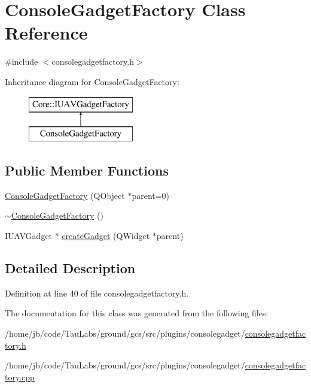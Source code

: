 \hypertarget{class_console_gadget_factory}{\section{\-Console\-Gadget\-Factory \-Class \-Reference}
\label{class_console_gadget_factory}
}


{\ttfamily \#include $<$consolegadgetfactory.\-h$>$}

\-Inheritance diagram for \-Console\-Gadget\-Factory\-:\begin{figure}[H]
\begin{center}
\leavevmode
\includegraphics[height=2.000000cm]{class_console_gadget_factory}
\end{center}
\end{figure}
\subsection*{\-Public \-Member \-Functions}
\begin{DoxyCompactItemize}
\item 
\hyperlink{group___console_plugin_ga77777adade86473e7c810b2e0a64e5b0}{\-Console\-Gadget\-Factory} (\-Q\-Object $\ast$parent=0)
\item 
\hyperlink{group___console_plugin_ga906d7deb3783cbcb35b88c42eb8be4d8}{$\sim$\-Console\-Gadget\-Factory} ()
\item 
\-I\-U\-A\-V\-Gadget $\ast$ \hyperlink{group___console_plugin_gac39d102639ab8db1917e47e48338487b}{create\-Gadget} (\-Q\-Widget $\ast$parent)
\end{DoxyCompactItemize}


\subsection{\-Detailed \-Description}


\-Definition at line 40 of file consolegadgetfactory.\-h.



\-The documentation for this class was generated from the following files\-:\begin{DoxyCompactItemize}
\item 
/home/jb/code/\-Tau\-Labs/ground/gcs/src/plugins/consolegadget/\hyperlink{consolegadgetfactory_8h}{consolegadgetfactory.\-h}\item 
/home/jb/code/\-Tau\-Labs/ground/gcs/src/plugins/consolegadget/\hyperlink{consolegadgetfactory_8cpp}{consolegadgetfactory.\-cpp}\end{DoxyCompactItemize}
